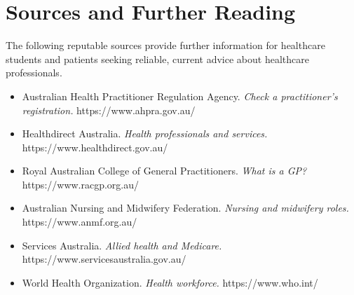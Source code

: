 \section*{Sources and Further Reading}
The following reputable sources provide further information for healthcare students and patients seeking reliable, current advice about healthcare professionals.

\begin{itemize}
    \item Australian Health Practitioner Regulation Agency. \textit{Check a practitioner's registration.} https://www.ahpra.gov.au/
    \item Healthdirect Australia. \textit{Health professionals and services.} https://www.healthdirect.gov.au/
    \item Royal Australian College of General Practitioners. \textit{What is a GP?} https://www.racgp.org.au/
    \item Australian Nursing and Midwifery Federation. \textit{Nursing and midwifery roles.} https://www.anmf.org.au/
    \item Services Australia. \textit{Allied health and Medicare.} https://www.servicesaustralia.gov.au/
    \item World Health Organization. \textit{Health workforce.} https://www.who.int/
\end{itemize}
